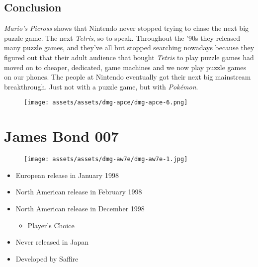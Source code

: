 \documentclass{book}
\begin{document}
\FloatBarrier\needspace{10mm}\section*{Conclusion}\nopagebreak[4]

\emph{Mario’s Picross} shows that Nintendo never stopped trying to chase the next big puzzle game. The next \emph{Tetris}, so to speak. Throughout the ’90s they released many puzzle games, and they’ve all but stopped searching nowadays because they figured out that their adult audience that bought \emph{Tetris} to play puzzle games had moved on to cheaper, dedicated, game machines and we now play puzzle games on our phones. The people at Nintendo eventually got their next big mainstream breakthrough. Just not with a puzzle game, but with \emph{Pokémon}.

\begin{figure}[hbt]
\vskip 10pt
\centering \texttt{[image: assets/assets/dmg-apce/dmg-apce-6.png]}
\vskip 6pt
\end{figure}



\begingroup \chapter*{James Bond 007} \endgroup
\begin{figure}[H]
\vskip 4pt
\centering
\texttt{[image: assets/assets/dmg-aw7e/dmg-aw7e-1.jpg]}\end{figure}
\begin{itemize} [nosep]




\item European release in January 1998







\item North American release in February 1998







\item North American release in December 1998
\begin{itemize} [nosep]\item Player’s Choice\end{itemize}\noindent







\item Never released in Japan





\item Developed by Saffire

\end{itemize}\noindent
\end{document}
